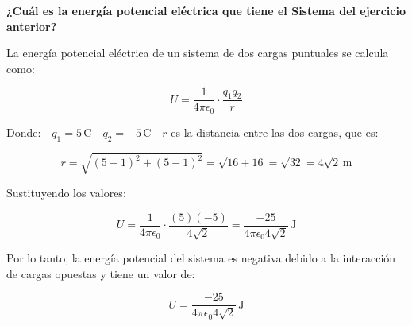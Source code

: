 \documentclass[12pt, answers]{exam} %
\begin{document}
\begin{questions}
    \question \large\textbf{¿Cuál es la energía potencial eléctrica que tiene el Sistema del ejercicio anterior?}

    
        La energía potencial eléctrica de un sistema de dos cargas puntuales se calcula como:
        
        \[
        U = \frac{1}{4 \pi \epsilon_0} \cdot \frac{q_1 q_2}{r}
        \]
        
        Donde:
        - \( q_1 = 5 \, \text{C} \)
        - \( q_2 = -5 \, \text{C} \)
        - \( r \) es la distancia entre las dos cargas, que es:
        
        \[
        r = \sqrt{(5-1)^2 + (5-1)^2} = \sqrt{16 + 16} = \sqrt{32} = 4\sqrt{2} \, \text{m}
        \]
        
        Sustituyendo los valores:
        
        \[
        U = \frac{1}{4 \pi \epsilon_0} \cdot \frac{(5)(-5)}{4\sqrt{2}} = \frac{-25}{4 \pi \epsilon_0 4\sqrt{2}} \, \text{J}
        \]
        
        Por lo tanto, la energía potencial del sistema es negativa debido a la interacción de cargas opuestas y tiene un valor de:
        
        \[
        U = \frac{-25}{4 \pi \epsilon_0 4\sqrt{2}} \, \text{J}
        \]
        
        
        
\end{questions}
\end{document}
